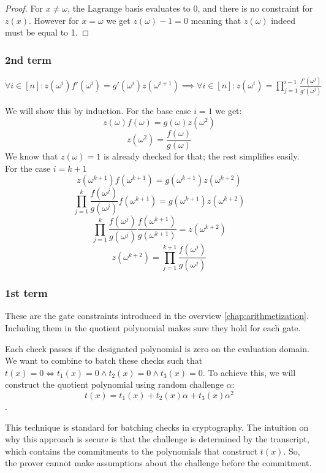 \begin{proof}
    For $x \neq \omega$, the Lagrange basis evaluates to 0, and there is no constraint for $z(x)$. However for $x = \omega$ we get $z(\omega) - 1 = 0$ meaning that $z(\omega)$ indeed must be equal to 1.
\end{proof}

\subsubsection{2nd term}
\begin{theorem}
    $\forall i \in [n]: z(\omega^i)f'(\omega^i) = g'(\omega^i)z(\omega^{i+1}) \implies \forall i \in [n]: z(\omega^i) = \prod_{j=1}^{i-1} \frac{f'(\omega^j)}{g'(\omega^j)}$
\end{theorem}

\begin{lemma}
    We will show this by induction. For the base case $i=1$ we get:
    $$z(\omega)f(\omega) = g(\omega)z(\omega^2)$$
    $$z(\omega^2) = \frac{f(\omega)}{g(\omega)}$$
    We know that $z(\omega) = 1$ is already checked for that; the rest simplifies easily. For the case $i =k+1$
    $$z(\omega^{k+1})f(\omega^{k+1}) = g(\omega^{k+1})z(\omega^{k+2})$$
    $$\prod_{j=1}^k \frac{f(\omega^j)}{g(\omega^j)} f(\omega^{k+1}) = g(\omega^{k+1})z(\omega^{k+2})$$
    $$\prod_{j=1}^k \frac{f(\omega^j)}{g(\omega^j)} \frac{f(\omega^{k+1})}{g(\omega^{k+1})} = z(\omega^{k+2})$$
    $$z(\omega^{k+2}) = \prod_{j=1}^{k+1} \frac{f(\omega^j)}{g(\omega^j)}$$    
\end{lemma}


\subsubsection{1st term}
These are the gate constraints introduced in the overview \eqref{chap:arithmetization}. Including them in the quotient polynomial makes sure they hold for each gate. 

Each check passes if the designated polynomial is zero on the evaluation domain. We want to combine to batch these checks such that $t(x) = 0 \iff t_1(x) = 0 \wedge t_2(x) = 0 \wedge t_3(x) = 0$. To achieve this, we will construct the quotient polynomial using random challenge $\alpha$:
$$t(x) = t_1(x) + t_2(x)\alpha + t_3(x)\alpha^2$$.

This technique is standard for batching checks in cryptography. The intuition on why this approach is secure is that the challenge is determined by the transcript, which contains the commitments to the polynomials that construct $t(x)$. So, the prover cannot make assumptions about the challenge before the commitment.

